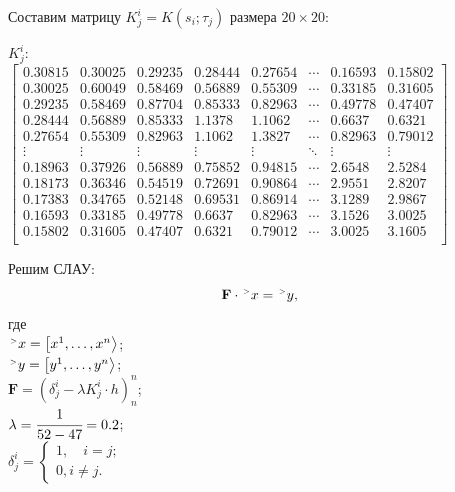 \documentclass[a4paper, 14pt]{extarticle}
\begin{document}
\newpage

Составим матрицу $K^i_j = K(s_i; \tau_j)$ размера $20 \times 20$:

\begin{center}
    $K^i_j:$ \\[1em]
    \begin{adjustbox}{max width=1\textwidth}
        \renewcommand{\arraystretch}{1}
    $\left[
        \begin{array}{cccccccccccccccccccc}
            0.30815 & 0.30025 & 0.29235 & 0.28444 & 0.27654 & \cdots & 0.16593 & 0.15802 \\
            0.30025 & 0.60049 & 0.58469 & 0.56889 & 0.55309 & \cdots & 0.33185 & 0.31605 \\
            0.29235 & 0.58469 & 0.87704 & 0.85333 & 0.82963 & \cdots & 0.49778 & 0.47407 \\
            0.28444 & 0.56889 & 0.85333 & 1.1378 & 1.1062 & \cdots & 0.6637 & 0.6321 \\
            0.27654 & 0.55309 & 0.82963 & 1.1062 & 1.3827 & \cdots & 0.82963 & 0.79012 \\
            \vdots & \vdots & \vdots & \vdots & \vdots & \ddots & \vdots & \vdots \\
            0.18963 & 0.37926 & 0.56889 & 0.75852 & 0.94815 & \cdots & 2.6548 & 2.5284 \\
            0.18173 & 0.36346 & 0.54519 & 0.72691 & 0.90864 & \cdots & 2.9551 & 2.8207 \\
            0.17383 & 0.34765 & 0.52148 & 0.69531 & 0.86914 & \cdots & 3.1289 & 2.9867 \\
            0.16593 & 0.33185 & 0.49778 & 0.6637 & 0.82963 & \cdots & 3.1526 & 3.0025 \\
            0.15802 & 0.31605 & 0.47407 & 0.6321 & 0.79012 & \cdots & 3.0025 & 3.1605 \\
        \end{array}
    \right]$
    \end{adjustbox}
\end{center}

\vspace{10pt}

Решим СЛАУ:
\begin{equation*}
    \textbf{F} \cdot \upgt x = \upgt y,
\end{equation*}
где \\
$\upgt x = \left[ x^1, \dots, x^n \right>$; \\[1em]
$\upgt y = \left[ y^1, \dots, y^n \right>$; \\[1em]
$\textbf{F} = \left(\delta^i_j - \lambda K^i_j \cdot h \right)^n_n$; \\[1em]
$\lambda = \cfrac{1}{52 - 47} = 0.2$; \\[1em]
$\delta^i_j = \begin{cases*}
    1, \quad i = j; \\
    0, i \neq j.
\end{cases*}$
\end{document}
